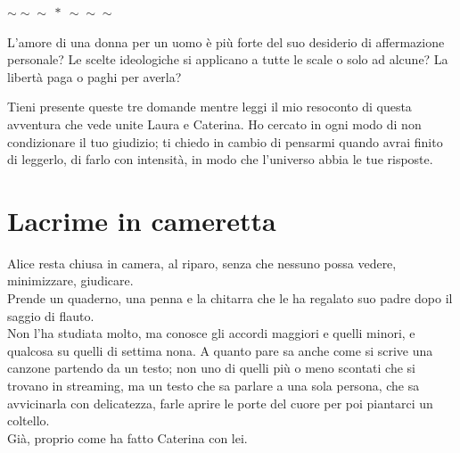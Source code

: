 \documentclass[10pt,oneside]{extbook}
\begin{document}
\vspace*{\fill}

\begin{center}
{\Large $\sim\!\!\sim\!\!\sim\ \ast\ \sim\!\!\sim\!\!\sim$}
\vspace{2em}

\begin{minipage}{0.78\textwidth}
\itshape

L'amore di una donna per un uomo \`e pi\`u forte del suo desiderio di affermazione personale?
Le scelte ideologiche si applicano a tutte le scale o solo ad alcune?
La libertà paga o paghi per averla?

\medskip

Tieni presente queste tre domande mentre leggi il mio resoconto di questa avventura
che vede unite Laura e Caterina. Ho cercato in ogni modo di non condizionare il tuo
giudizio; ti chiedo in cambio di pensarmi quando avrai finito di leggerlo, di farlo
con intensità, in modo che l'universo abbia le tue risposte.

\end{minipage}
\end{center}

\vspace*{\fill}

\clearpage
\clearpage{}

\cleardoublepage




\clearpage{}\cleardoublepage

\chapter*{Lacrime in cameretta}




Alice resta chiusa in camera, al riparo, senza che nessuno possa vedere, minimizzare, giudicare.\\
Prende un quaderno, una penna e la chitarra che le ha regalato suo padre dopo il saggio di flauto.\\

Non l'ha studiata molto, ma conosce gli accordi maggiori e quelli minori, e qualcosa su quelli di  settima nona. A quanto pare sa anche come si scrive una canzone partendo da un testo; non uno di quelli pi\`u o meno scontati che si trovano in streaming, ma un testo che sa parlare a una sola persona, che sa avvicinarla con delicatezza, farle aprire le porte del cuore per poi piantarci un coltello. \\
Già, proprio come ha fatto Caterina con lei.
\end{document}
